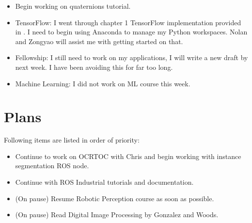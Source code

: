 \documentclass[11pt]{article}
\begin{document}
\begin{itemize}
	\item Begin working on quaternions tutorial.

	\item TensorFlow: I went through chapter 1 TensorFlow implementation provided in \cite{CVwithTF2}. I need to begin using Anaconda to manage my Python workspaces. Nolan and Zongyao will assist me with getting started on that.

	\item Fellowship: I still need to work on my applications, I will write a new draft by next week. I have been avoiding this for far too long.

	\item Machine Learning: I did not work on ML course this week.




\end{itemize}

\newpage

\section{Plans}
Following items are listed in order of priority:

\begin{itemize}
	\item Continue to work on OCRTOC with Chris and begin working with instance segmentation ROS node.

	\item Continue with ROS Industrial tutorials and documentation.

	\item (On pause) Resume Robotic Perception course as soon as possible.

	\item (On pause) Read Digital Image Processing by Gonzalez and Woods.

\end{itemize}



\newpage


\end{document}
